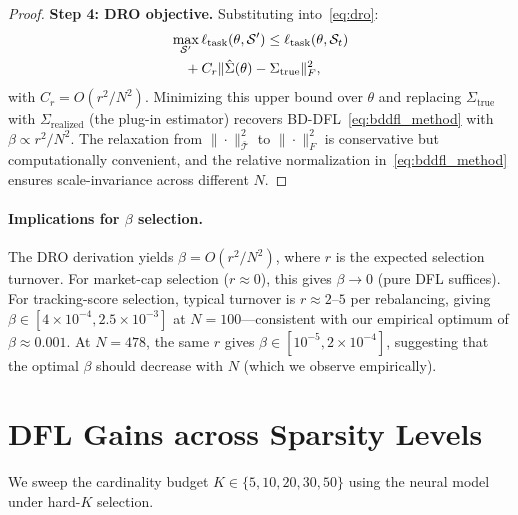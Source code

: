 \documentclass[letterpaper]{article}
\newcommand{\cS}{\mathcal{S}}
\begin{document}
\begin{proof}
\textbf{Step 4: DRO objective.} Substituting into~\eqref{eq:dro}:
\begin{align}
&\max_{\cS'} \ell_{\mathrm{task}}(\theta, \cS') \leq \ell_{\mathrm{task}}(\theta, \cS_t) \notag \\
&\quad + C_r \|\hat\Sigma(\theta) - \Sigma_{\mathrm{true}}\|_F^2, \notag
\end{align}
with $C_r = O(r^2/N^2)$. Minimizing this upper bound over $\theta$ and replacing $\Sigma_{\mathrm{true}}$ with $\Sigma_{\mathrm{realized}}$ (the plug-in estimator) recovers BD-DFL~\eqref{eq:bddfl_method} with $\beta \propto r^2 / N^2$. The relaxation from $\|\cdot\|_{\bar{\mathcal{T}}}^2$ to $\|\cdot\|_F^2$ is conservative but computationally convenient, and the relative normalization in~\eqref{eq:bddfl_method} ensures scale-invariance across different $N$.
\end{proof}

\paragraph{Implications for $\beta$ selection.}
The DRO derivation yields $\beta = O(r^2/N^2)$, where $r$ is the expected selection turnover. For market-cap selection ($r \approx 0$), this gives $\beta \to 0$ (pure DFL suffices). For tracking-score selection, typical turnover is $r \approx 2$--$5$ per rebalancing, giving $\beta \in [4 \times 10^{-4}, 2.5 \times 10^{-3}]$ at $N = 100$---consistent with our empirical optimum of $\beta \approx 0.001$. At $N = 478$, the same $r$ gives $\beta \in [10^{-5}, 2 \times 10^{-4}]$, suggesting that the optimal $\beta$ should decrease with $N$ (which we observe empirically).

\section{DFL Gains across Sparsity Levels}
\label{app:sparsity}

We sweep the cardinality budget $K \in \{5, 10, 20, 30, 50\}$ using the neural model under hard-$K$ selection.

\begin{table}[h]
\centering
\caption{Neural model: DFL vs.\ MSE across sparsity levels. 95\% CI from 10{,}000-sample bootstrap; $p$-values from Wilcoxon signed-rank.}
\label{tab:exp1}
\footnotesize
{}
\end{table}
\end{document}
